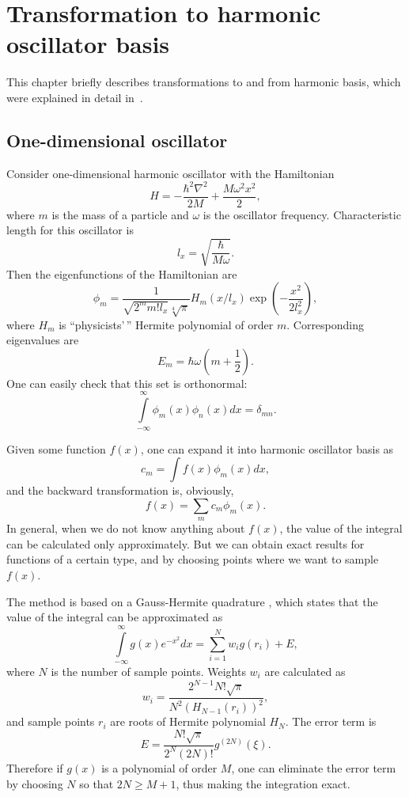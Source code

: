 \section{Transformation to harmonic oscillator basis}


This chapter briefly describes transformations to and from harmonic basis,
which were explained in detail in~\cite{Dion2003}.


\subsection{One-dimensional oscillator}

Consider one-dimensional harmonic oscillator with the Hamiltonian
\[
	H = -\frac{\hbar^2 \nabla^2}{2 M} + \frac{M \omega^2 x^2}{2},
\]
where $m$ is the mass of a particle and $\omega$ is the oscillator frequency.
Characteristic length for this oscillator is
\[
	l_x = \sqrt{\frac{\hbar}{M \omega}}.
\]
Then the eigenfunctions of the Hamiltonian are
\begin{equation}
\label{eqn:harmonic-transform:harmonic-modes}
	\phi_m = \frac{1}{\sqrt{2^m m! l_x} \sqrt[4]{\pi}} H_m(x / l_x)
		\exp \left( -\frac{x^2}{2 l_x^2} \right),
\end{equation}
where $H_m$ is ``physicists'\,'' Hermite polynomial of order $m$.
Corresponding eigenvalues are
\[
	E_m = \hbar \omega (m + \frac{1}{2}).
\]
One can easily check that this set is orthonormal:
\[
	\int\limits_{-\infty}^{\infty} \phi_m(x) \phi_n(x) dx = \delta_{mn}.
\]

Given some function $f(x)$, one can expand it into harmonic oscillator basis as
\[
	c_m = \int f(x) \phi_m(x) dx,
\]
and the backward transformation is, obviously,
\[
	f(x) = \sum_{m} c_m \phi_m(x).
\]
In general, when we do not know anything about $f(x)$,
the value of the integral can be calculated only approximately.
But we can obtain exact results for functions of a certain type,
and by choosing points where we want to sample $f(x)$.

The method is based on a Gauss-Hermite quadrature ,
which states that the value of the integral can be approximated as
\[
	\int\limits_{-\infty}^{\infty} g(x) e^{-x^2} dx
	= \sum_{i=1}^N w_i g(r_i) + E,
\]
where $N$ is the number of sample points.
Weights $w_i$ are calculated as
\[
	w_i = \frac{2^{N-1} N! \sqrt{\pi}}{N^2 (H_{N-1}(r_i))^2},
\]
and sample points $r_i$ are roots of Hermite polynomial $H_N$.
The error term is
\[
	E = \frac{N! \sqrt{\pi}}{2^N (2N)!} g^{(2N)}(\xi).
\]
Therefore if $g(x)$ is a polynomial of order $M$,
one can eliminate the error term by choosing $N$ so that $2N \ge M + 1$,
thus making the integration exact.

